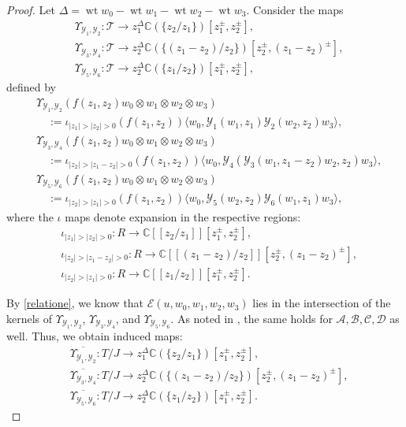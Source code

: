 \documentclass[9pt]{amsart}
\newcommand{\T}{\mathcal{T}}
\begin{document}
\begin{proof}
Let $\Delta = \operatorname{wt} w_0 - \operatorname{wt} w_1 - \operatorname{wt} w_2 - \operatorname{wt} w_3$. Consider the maps
\begin{align*}
&\Upsilon_{\mathcal{Y}_1,\mathcal{Y}_2}: \T \rightarrow z_1^{\Delta} \mathbb{C}(\{z_2 / z_1\})[z_1^{\pm}, z_2^{\pm}], \\
&\Upsilon_{\mathcal{Y}_3,\mathcal{Y}_4}: \T \rightarrow z_2^{\Delta} \mathbb{C}(\{(z_1 - z_2)/z_2\})[z_2^{\pm}, (z_1 - z_2)^{\pm}], \\
&\Upsilon_{\mathcal{Y}_5,\mathcal{Y}_6}: \T \rightarrow z_2^{\Delta} \mathbb{C}(\{z_1 / z_2\})[z_1^{\pm}, z_2^{\pm}],
\end{align*}
defined by
\begin{align*}
&\Upsilon_{\mathcal{Y}_1,\mathcal{Y}_2}(f(z_1, z_2) w_0 \otimes w_1 \otimes w_2 \otimes w_3) \\
&\quad := \iota_{|z_1| > |z_2| > 0}(f(z_1, z_2)) \langle w_0, \mathcal{Y}_1(w_1, z_1)\mathcal{Y}_2(w_2, z_2)w_3 \rangle, \\
&\Upsilon_{\mathcal{Y}_3,\mathcal{Y}_4}(f(z_1, z_2) w_0 \otimes w_1 \otimes w_2 \otimes w_3) \\
&\quad := \iota_{|z_2| > |z_1 - z_2| > 0}(f(z_1, z_2)) \langle w_0, \mathcal{Y}_4(\mathcal{Y}_3(w_1, z_1 - z_2)w_2, z_2)w_3 \rangle, \\
&\Upsilon_{\mathcal{Y}_5,\mathcal{Y}_6}(f(z_1, z_2) w_0 \otimes w_1 \otimes w_2 \otimes w_3) \\
&\quad := \iota_{|z_2| > |z_1| > 0}(f(z_1, z_2)) \langle w_0, \mathcal{Y}_5(w_2, z_2)\mathcal{Y}_6(w_1, z_1)w_3 \rangle,
\end{align*}
where the $\iota$ maps denote expansion in the respective regions:
\begin{align*}
&\iota_{|z_1| > |z_2| > 0}: R \to \mathbb{C}[[z_2 / z_1]][z_1^{\pm}, z_2^{\pm}], \\
&\iota_{|z_2| > |z_1 - z_2| > 0}: R \to \mathbb{C}[[(z_1 - z_2)/z_2]][z_2^{\pm}, (z_1 - z_2)^{\pm}], \\
&\iota_{|z_2| > |z_1| > 0}: R \to \mathbb{C}[[z_1 / z_2]][z_1^{\pm}, z_2^{\pm}].
\end{align*}

By \eqref{relatione}, we know that $\mathcal{E}(u, w_0, w_1, w_2, w_3)$ lies in the intersection of the kernels of $\Upsilon_{\mathcal{Y}_1,\mathcal{Y}_2}$, $\Upsilon_{\mathcal{Y}_3,\mathcal{Y}_4}$, and $\Upsilon_{\mathcal{Y}_5,\mathcal{Y}_6}$. As noted in \cite{huang2005differential1}, the same holds for $\mathcal{A}, \mathcal{B}, \mathcal{C}, \mathcal{D}$ as well. Thus, we obtain induced maps:
\begin{align*}
&\overline{\Upsilon_{\mathcal{Y}_1,\mathcal{Y}_2}}: T/J \rightarrow z_1^{\Delta} \mathbb{C}(\{z_2 / z_1\})[z_1^{\pm}, z_2^{\pm}], \\
&\overline{\Upsilon_{\mathcal{Y}_3,\mathcal{Y}_4}}: T/J \rightarrow z_2^{\Delta} \mathbb{C}(\{(z_1 - z_2)/z_2\})[z_2^{\pm}, (z_1 - z_2)^{\pm}], \\
&\overline{\Upsilon_{\mathcal{Y}_5,\mathcal{Y}_6}}: T/J \rightarrow z_2^{\Delta} \mathbb{C}(\{z_1 / z_2\})[z_1^{\pm}, z_2^{\pm}].
\end{align*}


\end{proof}
\end{document}
